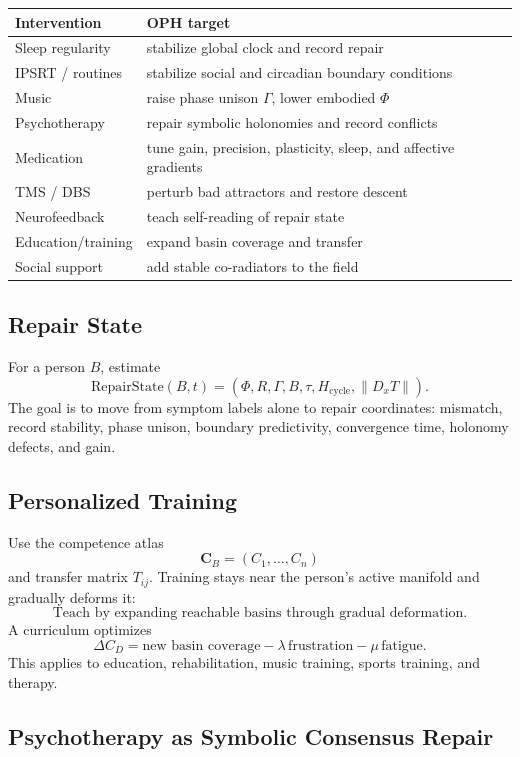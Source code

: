 \documentclass[11pt]{article}
\theoremstyle{remark}
\theoremstyle{plain}
\begin{document}
\begin{longtable}{L{0.26\textwidth}L{0.64\textwidth}}
\toprule
\textbf{Intervention} & \textbf{OPH target} \\
\midrule
\endhead
Sleep regularity & stabilize global clock and record repair \\
IPSRT / routines & stabilize social and circadian boundary conditions \\
Music & raise phase unison \(\Gamma\), lower embodied \(\Phi\) \\
Psychotherapy & repair symbolic holonomies and record conflicts \\
Medication & tune gain, precision, plasticity, sleep, and affective gradients \\
TMS / DBS & perturb bad attractors and restore descent \\
Neurofeedback & teach self-reading of repair state \\
Education/training & expand basin coverage and transfer \\
Social support & add stable co-radiators to the field \\
\bottomrule
\end{longtable}

\subsection{Repair State}

For a person \(B\), estimate
\[
\boxed{
\mathrm{RepairState}(B,t)
=
(\Phi,R,\Gamma,B,\tau,H_{\mathrm{cycle}},\|D_xT\|).
}
\]
The goal is to move from symptom labels alone to repair coordinates: mismatch, record stability, phase unison, boundary predictivity, convergence time, holonomy defects, and gain.

\subsection{Personalized Training}

Use the competence atlas
\[
\mathbf C_B=(C_1,\ldots,C_n)
\]
and transfer matrix \(T_{ij}\). Training stays near the person's active manifold and gradually deforms it:
\[
\boxed{
\text{Teach by expanding reachable basins through gradual deformation.}
}
\]
A curriculum optimizes
\[
\Delta C_D
=
\text{new basin coverage}
-
\lambda\,\text{frustration}
-
\mu\,\text{fatigue}.
\]
This applies to education, rehabilitation, music training, sports training, and therapy.

\subsection{Psychotherapy as Symbolic Consensus Repair}
\end{document}
